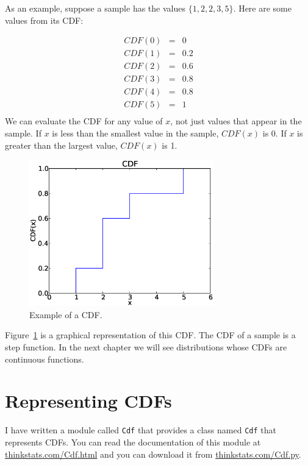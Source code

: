 \documentclass[12pt]{book}
\begin{document}
As an example, suppose a sample has the values $\{1, 2, 2, 3, 5\}$.
Here are some values from its CDF:

\begin{eqnarray*}
CDF(0) &=& 0    \\
CDF(1) &=& 0.2    \\
CDF(2) &=& 0.6    \\
CDF(3) &=& 0.8    \\
CDF(4) &=& 0.8    \\
CDF(5) &=& 1    \\
\end{eqnarray*}
%
We can evaluate the CDF for any value of $x$, not just
values that appear in the sample.
If $x$ is less than the smallest value in the sample, $CDF(x)$ is 0.
If $x$ is greater than the largest value, $CDF(x)$ is 1.

\begin{figure}
\centerline{\includegraphics[height=2.5in]{figs/example_cdf.eps}}
\caption{Example of a CDF.}
\label{example_cdf}
\end{figure}

Figure~\ref{example_cdf} is a graphical representation of this CDF.
The CDF of a sample is a step function.  In the next chapter we
will see distributions whose CDFs are continuous functions.  


\section{Representing CDFs}


I have written a module called {\tt Cdf} that provides a class named
{\tt Cdf} that represents CDFs.  You can read the documentation of
this module at \url{thinkstats.com/Cdf.html} and you can download it
from \url{thinkstats.com/Cdf.py}.
\end{document}
